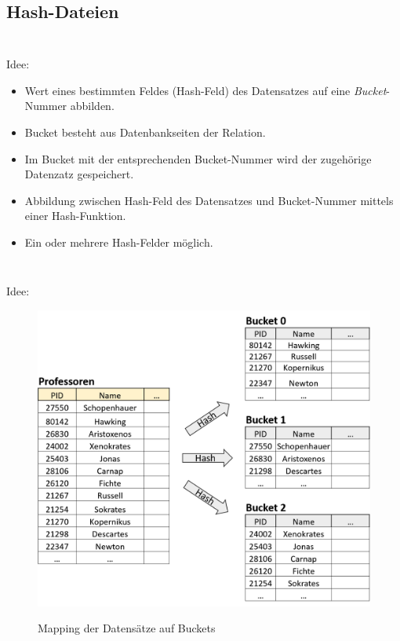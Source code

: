 \subsection{Hash-Dateien}

\begin{frame}
\frametitle{\insertsection}
\framesubtitle{\insertsubsection}
\\[4pt]
\abs
Idee: 
\begin{itemize}
	\item Wert eines bestimmten Feldes (Hash-Feld) des Datensatzes auf eine \textit{Bucket}-Nummer abbilden.
	\item Bucket besteht aus Datenbankseiten der Relation.		
	\item Im Bucket mit der entsprechenden Bucket-Nummer wird der zugeh\"orige Datenzatz gespeichert.
	\item Abbildung zwischen Hash-Feld des Datensatzes und Bucket-Nummer mittels einer Hash-Funktion.  
	\item Ein oder mehrere Hash-Felder m\"oglich.
\end{itemize}	
\end{frame}

\begin{frame}
\frametitle{\insertsection}
\framesubtitle{\insertsubsection}
\\[4pt]
Idee: 
\begin{figure}
\includegraphics[scale=0.35, trim=0 0 0 4cm]{img/Hash-Bucket-0.png}
\\[-8pt]\caption{Mapping der Datens\"atze auf Buckets}
\end{figure}
\end{frame}

